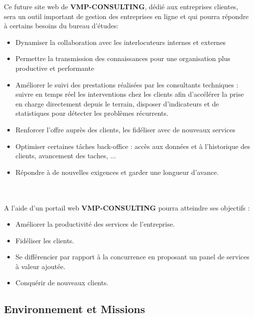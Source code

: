 \documentclass[12pt]{article}
\begin{document}
Ce future site web de \textbf{VMP-CONSULTING}, dédié aux entreprises clientes, sera un outil important
 de gestion des entreprises en ligne et qui pourra répondre à certains besoins du bureau d'études:
\begin{itemize}

\item  Dynamiser la collaboration avec les interlocuteurs internes et externes
 \item   Permettre la transmission des connaissances pour une organisation plus productive et performante
 \item     Améliorer le suivi des prestations réalisées par les consultants techniques : suivre en temps réel les interventions chez les clients afin d’accélérer la prise en charge directement depuis le terrain, disposer d’indicateurs et de statistiques pour détecter les problèmes récurrents.
 
 \item   Renforcer  l'offre auprès des clients, les fidéliser avec de nouveaux services
 \item   Optimiser certaines tâches back-office : accès aux données et à l’historique des  clients, avancement des taches, ...
\item    Répondre à de nouvelles exigences et garder une longueur d’avance.

\end{itemize}

\\ \\

A l'aide d'un portail web  \textbf{VMP-CONSULTING} pourra atteindre ses objectifs :

\begin{itemize}

\item Améliorer la productivité des services de l'entreprise.
\item Fidéliser les clients.
\item Se différencier par rapport à la concurrence en proposant un panel de services à
valeur ajoutée.
\item Conquérir de nouveaux clients.
\end{itemize}



\subsection{Environnement et Missions}
\end{document}
